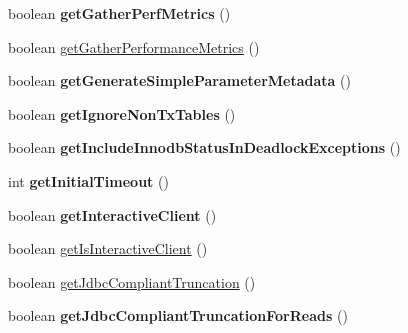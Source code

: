 \begin{DoxyCompactItemize}
boolean {\bfseries get\+Gather\+Perf\+Metrics} ()
\item 
boolean \mbox{\hyperlink{classcom_1_1mysql_1_1jdbc_1_1_multi_host_my_s_q_l_connection_a5e3312dbc7d1e713c67aa90d1d7527be}{get\+Gather\+Performance\+Metrics}} ()
\item 
\mbox{\label{classcom_1_1mysql_1_1jdbc_1_1_multi_host_my_s_q_l_connection_adf75a58ed878cff7c556bd7a58fc0ef5}} 
boolean {\bfseries get\+Generate\+Simple\+Parameter\+Metadata} ()
\item 
\mbox{\label{classcom_1_1mysql_1_1jdbc_1_1_multi_host_my_s_q_l_connection_ac98bd0a6cb24f433149de5a1c115a8d2}} 
boolean {\bfseries get\+Ignore\+Non\+Tx\+Tables} ()
\item 
\mbox{\label{classcom_1_1mysql_1_1jdbc_1_1_multi_host_my_s_q_l_connection_ad053d09be80341d07427e12ccad4e9da}} 
boolean {\bfseries get\+Include\+Innodb\+Status\+In\+Deadlock\+Exceptions} ()
\item 
\mbox{\label{classcom_1_1mysql_1_1jdbc_1_1_multi_host_my_s_q_l_connection_a5140f7cda4440ed716c4685f620a461d}} 
int {\bfseries get\+Initial\+Timeout} ()
\item 
\mbox{\label{classcom_1_1mysql_1_1jdbc_1_1_multi_host_my_s_q_l_connection_ad0041a5594672a3121a59ca28a944436}} 
boolean {\bfseries get\+Interactive\+Client} ()
\item 
boolean \mbox{\hyperlink{classcom_1_1mysql_1_1jdbc_1_1_multi_host_my_s_q_l_connection_a49aeeb12ed118d916aaba4f6144ce24d}{get\+Is\+Interactive\+Client}} ()
\item 
boolean \mbox{\hyperlink{classcom_1_1mysql_1_1jdbc_1_1_multi_host_my_s_q_l_connection_aa7498b944d87abde92d8e38ddd15afe9}{get\+Jdbc\+Compliant\+Truncation}} ()
\item 
\mbox{\label{classcom_1_1mysql_1_1jdbc_1_1_multi_host_my_s_q_l_connection_a7a8038c24e0aa674f0f361b6faa8c1dd}} 
boolean {\bfseries get\+Jdbc\+Compliant\+Truncation\+For\+Reads} ()

\end{DoxyCompactItemize}
